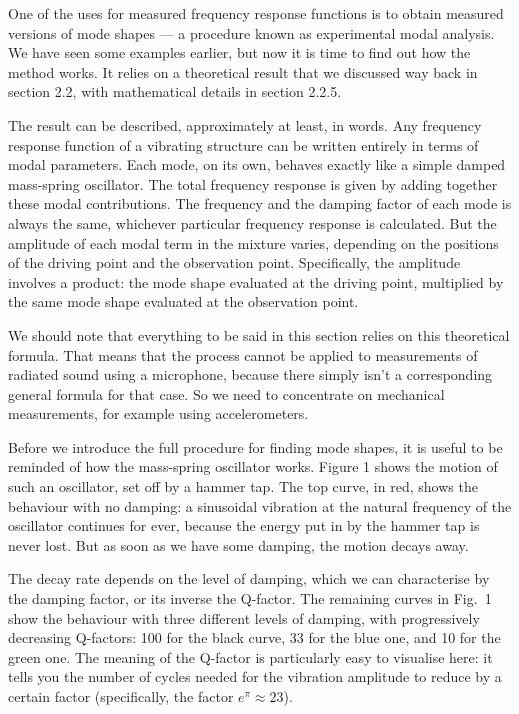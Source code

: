 

  One of the uses for measured frequency response functions is to obtain 
  measured versions of mode shapes — a procedure known as experimental modal 
  analysis. We have seen some examples earlier, but now it is time to find out 
  how the method works. It relies on a theoretical result that we discussed way 
  back in section 2.2, with mathematical details in section 2.2.5. 

  The result can be described, approximately at least, in words. Any frequency 
  response function of a vibrating structure can be written entirely in terms 
  of modal parameters. Each mode, on its own, behaves exactly like a simple 
  damped mass-spring oscillator. The total frequency response is given by 
  adding together these modal contributions. The frequency and the damping 
  factor of each mode is always the same, whichever particular frequency 
  response is calculated. But the amplitude of each modal term in the mixture 
  varies, depending on the positions of the driving point and the observation 
  point. Specifically, the amplitude involves a product: the mode shape 
  evaluated at the driving point, multiplied by the same mode shape evaluated 
  at the observation point. 

  We should note that everything to be said in this section relies on this 
  theoretical formula. That means that the process cannot be applied to 
  measurements of radiated sound using a microphone, because there simply isn't 
  a corresponding general formula for that case. So we need to concentrate on 
  mechanical measurements, for example using accelerometers. 

  Before we introduce the full procedure for finding mode shapes, it is useful 
  to be reminded of how the mass-spring oscillator works. Figure 1 shows the 
  motion of such an oscillator, set off by a hammer tap. The top curve, in red, 
  shows the behaviour with no damping: a sinusoidal vibration at the natural 
  frequency of the oscillator continues for ever, because the energy put in by 
  the hammer tap is never lost. But as soon as we have some damping, the motion 
  decays away. 


  The decay rate depends on the level of damping, which we can characterise by 
  the damping factor, or its inverse the Q-factor. The remaining curves in 
  Fig.\ 1 show the behaviour with three different levels of damping, with 
  progressively decreasing Q-factors: 100 for the black curve, 33 for the blue 
  one, and 10 for the green one. The meaning of the Q-factor is particularly 
  easy to visualise here: it tells you the number of cycles needed for the 
  vibration amplitude to reduce by a certain factor (specifically, the factor 
  $e^\pi \approx 23$). 

